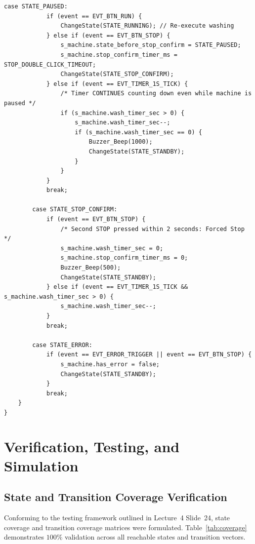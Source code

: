 \documentclass[12pt]{article}
\begin{document}
\begin{lstlisting}[caption={Core EFSM state evaluation engine implementing the Moore washing machine controller.}, label={lst:fsm_code}]
        case STATE_PAUSED:
            if (event == EVT_BTN_RUN) {
                ChangeState(STATE_RUNNING); // Re-execute washing
            } else if (event == EVT_BTN_STOP) {
                s_machine.state_before_stop_confirm = STATE_PAUSED;
                s_machine.stop_confirm_timer_ms = STOP_DOUBLE_CLICK_TIMEOUT;
                ChangeState(STATE_STOP_CONFIRM);
            } else if (event == EVT_TIMER_1S_TICK) {
                /* Timer CONTINUES counting down even while machine is paused */
                if (s_machine.wash_timer_sec > 0) {
                    s_machine.wash_timer_sec--;
                    if (s_machine.wash_timer_sec == 0) {
                        Buzzer_Beep(1000);
                        ChangeState(STATE_STANDBY);
                    }
                }
            }
            break;

        case STATE_STOP_CONFIRM:
            if (event == EVT_BTN_STOP) {
                /* Second STOP pressed within 2 seconds: Forced Stop */
                s_machine.wash_timer_sec = 0;
                s_machine.stop_confirm_timer_ms = 0;
                Buzzer_Beep(500);
                ChangeState(STATE_STANDBY);
            } else if (event == EVT_TIMER_1S_TICK && s_machine.wash_timer_sec > 0) {
                s_machine.wash_timer_sec--;
            }
            break;

        case STATE_ERROR:
            if (event == EVT_ERROR_TRIGGER || event == EVT_BTN_STOP) {
                s_machine.has_error = false;
                ChangeState(STATE_STANDBY);
            }
            break;
    }
}
\end{lstlisting}

\section{Verification, Testing, and Simulation}

\subsection{State and Transition Coverage Verification}
Conforming to the testing framework outlined in Lecture~4 Slide~24, state coverage and transition coverage matrices were formulated. Table~\ref{tab:coverage} demonstrates $100\%$ validation across all reachable states and transition vectors.
\end{document}
